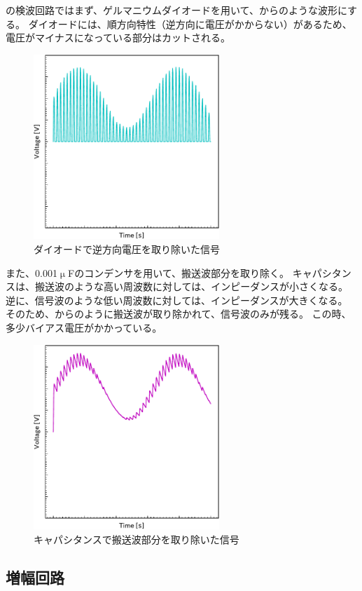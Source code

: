 \documentclass[report.tex]{subfiles}
\begin{document}
の検波回路ではまず、ゲルマニウムダイオードを用いて、からのような波形にする。
ダイオードには、順方向特性（逆方向に電圧がかからない）があるため、電圧がマイナスになっている部分はカットされる\cite{電子回路}。

\begin{figure}[H]
	\centering
	\includegraphics[width=7cm]{fig/diode.pdf}
	\caption{ダイオードで逆方向電圧を取り除いた信号}
	\label{fig:diode}
\end{figure}

また、0.001\(\upmu\)Fのコンデンサを用いて、搬送波部分を取り除く。
キャパシタンスは、搬送波のような高い周波数に対しては、インピーダンスが小さくなる。
逆に、信号波のような低い周波数に対しては、インピーダンスが大きくなる。
そのため、からのように搬送波が取り除かれて、信号波のみが残る。
この時、多少バイアス電圧がかかっている。

\begin{figure}[H]
	\centering
	\includegraphics[width=7cm]{fig/capa.pdf}
	\caption{キャパシタンスで搬送波部分を取り除いた信号}
	\label{fig:capa}
\end{figure}

\subsection{増幅回路}
\end{document}
